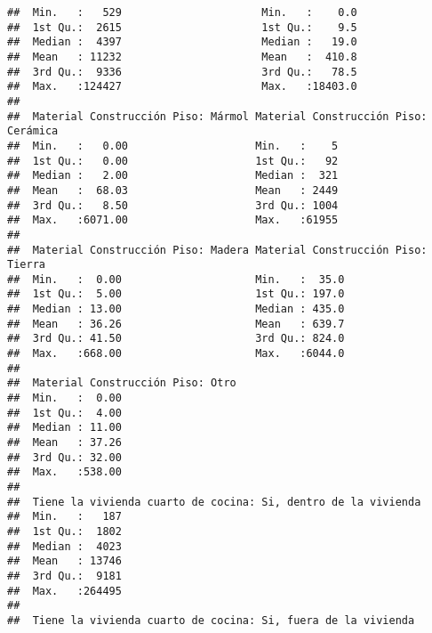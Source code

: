 \documentclass[11pt,]{article}
\begin{document}
\begin{verbatim}
##  Min.   :   529                      Min.   :    0.0                    
##  1st Qu.:  2615                      1st Qu.:    9.5                    
##  Median :  4397                      Median :   19.0                    
##  Mean   : 11232                      Mean   :  410.8                    
##  3rd Qu.:  9336                      3rd Qu.:   78.5                    
##  Max.   :124427                      Max.   :18403.0                    
##                                                                         
##  Material Construcción Piso: Mármol Material Construcción Piso: Cerámica
##  Min.   :   0.00                    Min.   :    5                       
##  1st Qu.:   0.00                    1st Qu.:   92                       
##  Median :   2.00                    Median :  321                       
##  Mean   :  68.03                    Mean   : 2449                       
##  3rd Qu.:   8.50                    3rd Qu.: 1004                       
##  Max.   :6071.00                    Max.   :61955                       
##                                                                         
##  Material Construcción Piso: Madera Material Construcción Piso: Tierra
##  Min.   :  0.00                     Min.   :  35.0                    
##  1st Qu.:  5.00                     1st Qu.: 197.0                    
##  Median : 13.00                     Median : 435.0                    
##  Mean   : 36.26                     Mean   : 639.7                    
##  3rd Qu.: 41.50                     3rd Qu.: 824.0                    
##  Max.   :668.00                     Max.   :6044.0                    
##                                                                       
##  Material Construcción Piso: Otro
##  Min.   :  0.00                  
##  1st Qu.:  4.00                  
##  Median : 11.00                  
##  Mean   : 37.26                  
##  3rd Qu.: 32.00                  
##  Max.   :538.00                  
##                                  
##  Tiene la vivienda cuarto de cocina: Si, dentro de la vivienda
##  Min.   :   187                                               
##  1st Qu.:  1802                                               
##  Median :  4023                                               
##  Mean   : 13746                                               
##  3rd Qu.:  9181                                               
##  Max.   :264495                                               
##                                                               
##  Tiene la vivienda cuarto de cocina: Si, fuera de la vivienda

\end{verbatim}
\end{document}
